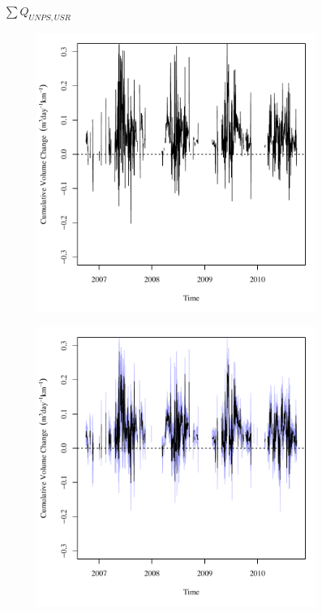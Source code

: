 \begin{linenumbers}
\subfiguretop
\begin{landscape}
	\begin{figure}
		\centering
		$ \displaystyle \sum Q_{UNPS, USR} $
		\begin{subfigure}{0.7\textwidth}
			\centering
			\includegraphics[width=\tableCustomSize]{"Figures/Results_USR/Deterministic/Balance Water"}
		\end{subfigure}%
		\begin{subfigure}{0.7\textwidth}
			\centering
			\includegraphics[width=\tableCustomSize]{"Figures/Results_USR/Stochastic/Balance Water"}

\end{subfigure}
\end{figure}
\end{landscape}
\end{linenumbers}

